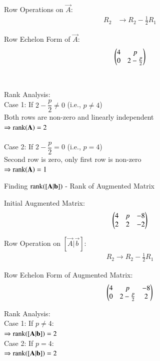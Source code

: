 \documentclass[journal]{IEEEtran}
\begin{document}
Row Operations on $\vec{A}$:
\begin{align}
R_2 &\to R_2 - \frac{1}{2}R_1
\end{align}

Row Echelon Form of $ \vec{A} $:
\begin{equation}
\begin{pmatrix}4 & p \\ 0 & 2 - \tfrac{p}{2}\end{pmatrix}
\end{equation}\\\\

Rank Analysis:\\
    Case 1: If $ 2 - \dfrac{p}{2} \neq 0 $ (i.e., $ p \neq 4 $)\\
        Both rows are non-zero and linearly independent \\
        $ \Rightarrow \text{rank}(\mathbf{A}) = 2 $\\\\
Case 2: If $ 2 - \dfrac{p}{2} = 0 $ (i.e., $ p = 4 $)\\
        Second row is zero, only first row is non-zero \\
        $ \Rightarrow \text{rank}(\mathbf{A}) = 1 $
\bigskip

Finding $\text{rank}([\mathbf{A}|\mathbf{b}])$ - Rank of Augmented Matrix

Initial Augmented Matrix:
\begin{equation}
\begin{pmatrix}4 & p & -8 \\ 2 & 2 & -2\end{pmatrix}
\end{equation}

Row Operation on $[\vec{A}|\vec{b}]$:\\ 
\begin{align}
R_2 \to R_2 - \frac{1}{2}R_1
\end{align}

Row Echelon Form of Augmented Matrix:
\begin{equation}
\begin{pmatrix}4 & p & -8 \\ 0 & 2-\frac{p}{2} & 2\end{pmatrix}
\end{equation}

Rank Analysis:\\
Case 1: If $ p \neq 4 $:\\
$\Rightarrow \text{rank}([\mathbf{A}|\mathbf{b}]) = 2$\\

Case 2: If $ p = 4 $:\\
$ \Rightarrow \text{rank}([\mathbf{A}|\mathbf{b}]) = 2 $\\\\
\end{document}
